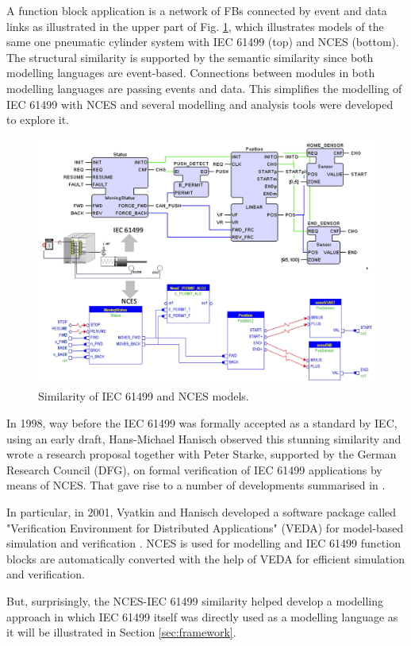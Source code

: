 \documentclass[runningheads]{llncs}
\begin{document}
A function block application is a network of FBs connected by event and data links as illustrated in the upper part of Fig. \ref{fig:similarity}, which illustrates models of the same one pneumatic cylinder system with IEC 61499 (top) and NCES (bottom). The structural similarity is supported by the semantic similarity since both modelling languages are event-based. Connections between modules in both modelling languages are passing events and data. 
This simplifies the modelling of IEC 61499 with NCES and several modelling and analysis tools were developed to explore it. 

\begin {figure}
    \centering
    \includegraphics [width = .8 \textwidth] {images/similarity.jpg}
    \caption {Similarity of IEC 61499 and NCES models.}
    \label {fig:similarity}
\end {figure}

In 1998, way before the IEC 61499 was formally accepted as a standard by IEC, using an early draft, Hans-Michael Hanisch observed this stunning similarity and wrote a research proposal together with Peter Starke, supported by the German Research Council (DFG), on formal verification of IEC 61499 applications by means of NCES. That gave rise to a number of developments summarised in \cite{hanisch2009one}.

In particular, in 2001, Vyatkin and Hanisch developed a software package called "Verification Environment for Distributed Applications" (VEDA) for model-based simulation and verification \cite{vyatkin2001formal}. NCES is used for modelling and IEC 61499 function blocks are automatically converted with the help of VEDA for efficient simulation and verification. 

But, surprisingly, the NCES-IEC 61499 similarity helped develop a modelling approach in which IEC 61499 itself was directly used as a modelling language as it will be illustrated in Section \ref{sec:framework}. 
\end{document}
